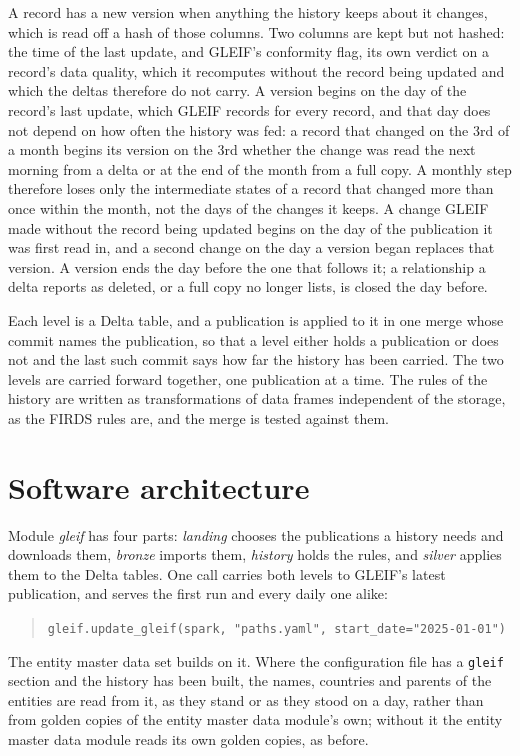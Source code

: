 A record has a new version when anything the history keeps about it changes, which is read off a hash of those columns. Two columns are kept but not hashed: the time of the last update, and GLEIF's conformity flag, its own verdict on a record's data quality, which it recomputes without the record being updated and which the deltas therefore do not carry. A version begins on the day of the record's last update, which GLEIF records for every record, and that day does not depend on how often the history was fed: a record that changed on the 3rd of a month begins its version on the 3rd whether the change was read the next morning from a delta or at the end of the month from a full copy. A monthly step therefore loses only the intermediate states of a record that changed more than once within the month, not the days of the changes it keeps. A change GLEIF made without the record being updated begins on the day of the publication it was first read in, and a second change on the day a version began replaces that version. A version ends the day before the one that follows it; a relationship a delta reports as deleted, or a full copy no longer lists, is closed the day before.

Each level is a Delta table, and a publication is applied to it in one merge whose commit names the publication, so that a level either holds a publication or does not and the last such commit says how far the history has been carried. The two levels are carried forward together, one publication at a time. The rules of the history are written as transformations of data frames independent of the storage, as the FIRDS rules are, and the merge is tested against them.

\section{Software architecture}

Module \emph{gleif} has four parts: \emph{landing} chooses the publications a history needs and downloads them, \emph{bronze} imports them, \emph{history} holds the rules, and \emph{silver} applies them to the Delta tables. One call carries both levels to GLEIF's latest publication, and serves the first run and every daily one alike:
\begin{quote}
\verb|gleif.update_gleif(spark, "paths.yaml", start_date="2025-01-01")|
\end{quote}
The entity master data set builds on it. Where the configuration file has a \verb|gleif| section and the history has been built, the names, countries and parents of the entities are read from it, as they stand or as they stood on a day, rather than from golden copies of the entity master data module's own; without it the entity master data module reads its own golden copies, as before.
